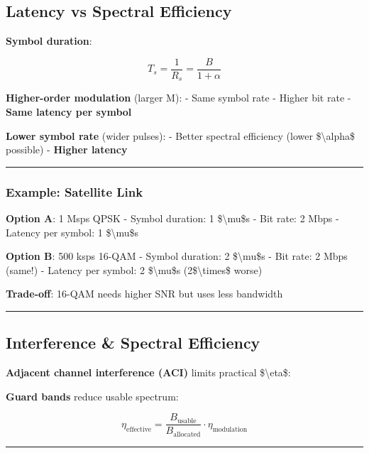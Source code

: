\subsection{Latency vs Spectral
Efficiency}\label{latency-vs-spectral-efficiency}

\textbf{Symbol duration}:

\[
T_s = \frac{1}{R_s} = \frac{B}{1 + \alpha}
\]

\textbf{Higher-order modulation} (larger M): - Same symbol rate - Higher
bit rate - \textbf{Same latency per symbol}

\textbf{Lower symbol rate} (wider pulses): - Better spectral efficiency
(lower \$\textbackslash alpha\$ possible) - \textbf{Higher latency}

\begin{center}\rule{0.5\linewidth}{0.5pt}\end{center}

\subsubsection{Example: Satellite Link}\label{example-satellite-link}

\textbf{Option A}: 1 Msps QPSK - Symbol duration: 1
\$\textbackslash mu\$s - Bit rate: 2 Mbps - Latency per symbol: 1
\$\textbackslash mu\$s

\textbf{Option B}: 500 ksps 16-QAM - Symbol duration: 2
\$\textbackslash mu\$s - Bit rate: 2 Mbps (same!) - Latency per symbol:
2 \$\textbackslash mu\$s (2\$\textbackslash times\$ worse)

\textbf{Trade-off}: 16-QAM needs higher SNR but uses less bandwidth

\begin{center}\rule{0.5\linewidth}{0.5pt}\end{center}

\subsection{Interference \& Spectral
Efficiency}\label{interference-spectral-efficiency}

\textbf{Adjacent channel interference (ACI)} limits practical
\$\textbackslash eta\$:

\textbf{Guard bands} reduce usable spectrum:

\[
\eta_{\text{effective}} = \frac{B_{\text{usable}}}{B_{\text{allocated}}} \cdot \eta_{\text{modulation}}
\]

\begin{center}\rule{0.5\linewidth}{0.5pt}\end{center}

